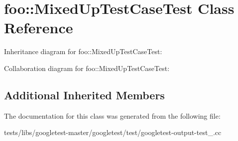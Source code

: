 \hypertarget{classfoo_1_1MixedUpTestCaseTest}{}\section{foo\+:\+:Mixed\+Up\+Test\+Case\+Test Class Reference}
\label{classfoo_1_1MixedUpTestCaseTest}


Inheritance diagram for foo\+:\+:Mixed\+Up\+Test\+Case\+Test\+:


Collaboration diagram for foo\+:\+:Mixed\+Up\+Test\+Case\+Test\+:
\subsection*{Additional Inherited Members}


The documentation for this class was generated from the following file\+:\begin{DoxyCompactItemize}
\item 
tests/libs/googletest-\/master/googletest/test/googletest-\/output-\/test\+\_\+.\+cc\end{DoxyCompactItemize}
